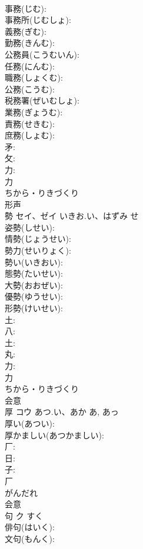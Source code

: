 \documentclass[8pt]{extreport}
\begin{document}
\begin{CJK}{UTF8}{min}
\\	事務(じむ): 
\\	事務所(じむしょ): 
\\	義務(ぎむ): 
\\	勤務(きんむ): 
\\	公務員(こうむいん): 
\\	任務(にんむ): 
\\	職務(しょくむ): 
\\	公務(こうむ): 
\\	税務署(ぜいむしょ): 
\\	業務(ぎょうむ): 
\\	責務(せきむ): 
\\	庶務(しょむ): 
\\	矛: 
\\	攵: 
\\	力: 
\\	力	
\\	ちから・りきづくり	
\\	形声 
\\	勢	セイ、ゼイ	いきお.い、はずみ	せ	
\\	姿勢(しせい): 
\\	情勢(じょうせい): 
\\	勢力(せいりょく): 
\\	勢い(いきおい): 
\\	態勢(たいせい): 
\\	大勢(おおぜい): 
\\	優勢(ゆうせい): 
\\	形勢(けいせい): 
\\	土: 
\\	八: 
\\	土: 
\\	丸: 
\\	力: 
\\	力	
\\	ちから・りきづくり	
\\	会意 
\\	厚	コウ	あつ.い、あか	あ, あっ	
\\	厚い(あつい): 
\\	厚かましい(あつかましい): 
\\	厂: 
\\	日: 
\\	子: 
\\	厂	
\\	がんだれ	
\\	会意 
\\	句	ク		すく	
\\	俳句(はいく): 
\\	文句(もんく): 

\end{CJK}
\end{document}

